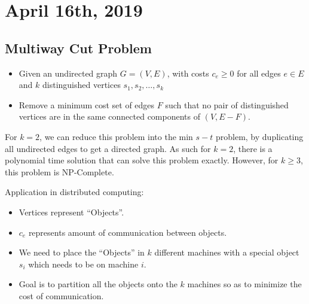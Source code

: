 \documentclass[../main/main.tex]{subfiles}
\begin{document}
\section{April 16th, 2019}
\subsection{Multiway Cut Problem}
\begin{itemize}
	\item Given an undirected graph $G=(V,E)$, with costs $c_e\ge 0$ for all edges $e\in E$ and $k$ distinguished vertices $s_1, s_2, \ldots,s_k$ 
	\item Remove a minimum cost set of edges $F$ such that no pair of distinguished vertices are in the same connected components of $(V,E-F)$.
\end{itemize}
\begin{remark}
	For $k=2$, we can reduce this problem into the min $s-t$ problem, by duplicating all undirected edges to get a directed graph. As such for $k=2$, there is a polynomial time solution that can solve this problem exactly. However, for $k\ge 3$, this problem is NP-Complete.
\end{remark}

Application in distributed computing: 
\begin{itemize}
	\item Vertices represent ``Objects''.
	\item $c_e$ represents amount of communication between objects.
	\item We need to place the ``Objects'' in $k$ different machines with a special object $s_i$ which needs to be on machine $i$.
	\item Goal is to partition all the objects onto the $k$ machines so as to minimize the cost of communication.
\end{itemize}
\end{document}
